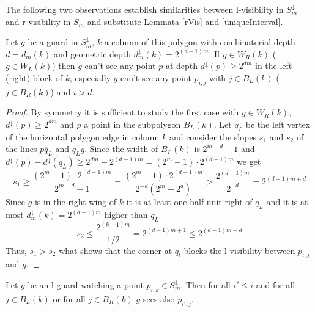 \documentclass[a4paper,USenglish,numberwithinsect]{lipics}
\theoremstyle{plain}
\begin{document}
The following two observations establish  similarities between 
l-visibility in   $S_m^{\downarrow}$
and r-visibility in $S_m$ and substitute Lemmata \ref{rVis} and \ref{uniqueInterval}.
\begin{lemma}
\label{lVis1}
Let $g$ be a guard  in $S_m^{\downarrow}$, $k$ a column
of this polygon with
combinatorial depth $d=d_m(k)$ and geometric depth
$d_m^{\downarrow}(k)=2^{(d-1)m}$.
If $g \in W_R(k)$ ($g \in W_L(k)$)
then $g$ can't see any point $p$ at depth $ d^{\downarrow}(p) \geq
2^{dm}$ in the left (right) block
of $k$, especially $g$ can't see
any point $p_{i,j}$ with $j \in B_L(k)$ ($j \in B_R(k)$) and $i > d$.
\end{lemma}
\begin{proof}
By symmetry it is sufficient to study the first case with $g \in
W_R(k)$, $d^{\downarrow}(p) \geq 2^{dm} $ and
$p$ a point in the subpolygon  $B_L(k)$.
Let $q_L$ be the left vertex of the horizontal polygon edge in column $k$ and
consider the  slopes $s_1$ and $s_2$ of the lines $\overline{pq_L}$ and
$\overline{q_Lg}$.
Since the width of $B_L(k)$ is $2^{m-d}-1$ and
$d^{\downarrow}(p)-d^{\downarrow}(q_L) \geq 2^{dm} - 2^{(d-1)m} =(2^m-1)
\cdot 2^{(d-1)m} $  we get
\[s_1 \geq \frac{(2^m-1) \cdot 2^{(d-1)m}}{2^{m-d}-1}
=\frac{(2^m-1) \cdot 2^{(d-1)m}}{2^{-d}(2^m-2^d) }
> \frac{2^{(d-1)m}}{2^{-d}}= 2^{(d-1)m+d}  \]
Since $g$ is in the right wing of $k$ it is at least one half unit right
of $q_L$ and it is at most
$d_m^{\downarrow}(k)=2^{(d-1)m}$ higher than $q_L$
\[s_2 \leq \frac{2^{(k-1)m}}{1/2}  = 2^{(d-1)m+1}\leq  2^{(d-1)m+d} \]
Thus, $s_1>s_2$ what shows that the corner at $q_l$ blocks the
l-visibility between $p_{i,j}$ and $g$.
\end{proof}
\begin{lemma}
\label{lVis2}
Let $g$ be an l-guard watching a point $p_{i,k} \in S_m^{\downarrow}$.
Then for all $i' \leq i$ and for all $j \in B_L(k)$ or for all $j \in
B_R(k)$
$g$ sees also   $p_{i',j}$.
\end{lemma}
\end{document}
